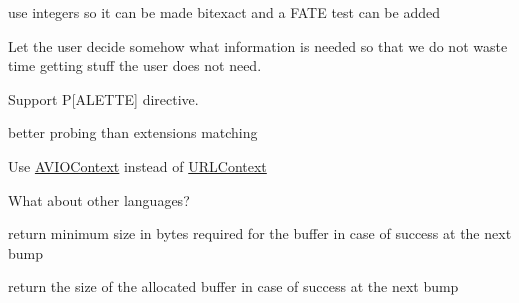 \begin{DoxyRefList}
\begin{DoxyItemize}
\item use integers so it can be made bitexact and a F\+A\+TE test can be added  
\end{DoxyItemize}
\item[Member \mbox{\hyperlink{group__lavf__decoding_gad42172e27cddafb81096939783b157bb}{avformat\+\_\+find\+\_\+stream\+\_\+info}} (\mbox{\hyperlink{struct_a_v_format_context}{A\+V\+Format\+Context}} $\ast$ic, \mbox{\hyperlink{struct_a_v_dictionary}{A\+V\+Dictionary}} $\ast$$\ast$options)]\label{todo__todo000034}%
%
Let the user decide somehow what information is needed so that we do not waste time getting stuff the user does not need.  
\item[File \mbox{\hyperlink{libavformat_2jacosubdec_8c}{jacosubdec.c}} ]\label{todo__todo000035}%
%
Support P\mbox{[}A\+L\+E\+T\+TE\mbox{]} directive.  
\item[File \mbox{\hyperlink{libmodplug_8c}{libmodplug.c}} ]\label{todo__todo000036}%
%
better probing than extensions matching  
\item[Member \mbox{\hyperlink{rtsp_8h_a8ac745c067a6a8a1cd15bc477e3673e3}{R\+T\+S\+P\+State}} ]\label{todo__todo000037}%
%
Use \mbox{\hyperlink{struct_a_v_i_o_context}{A\+V\+I\+O\+Context}} instead of \mbox{\hyperlink{struct_u_r_l_context}{U\+R\+L\+Context}}  
\item[Member \mbox{\hyperlink{struct_a_v_option_a6c72d22b8c599e89abba088b85dfcd8a}{A\+V\+Option\+::help}} ]\label{todo__todo000038}%
%
What about other languages?  
\item[Member \mbox{\hyperlink{group__lavu__sampmanip_ga673254a62fa75dab3211caf17c73c6eb}{av\+\_\+samples\+\_\+fill\+\_\+arrays}} (uint8\+\_\+t $\ast$$\ast$audio\+\_\+data, int $\ast$linesize, const uint8\+\_\+t $\ast$buf, int nb\+\_\+channels, int nb\+\_\+samples, enum A\+V\+Sample\+Format sample\+\_\+fmt, int align)]\label{todo__todo000039}%
%
return minimum size in bytes required for the buffer in case of success at the next bump  
\item[Member \mbox{\hyperlink{group__lavu__sampmanip_ga4db4c77f928d32c7d8854732f50b8c04}{av\+\_\+samples\+\_\+alloc}} (uint8\+\_\+t $\ast$$\ast$audio\+\_\+data, int $\ast$linesize, int nb\+\_\+channels, int nb\+\_\+samples, enum A\+V\+Sample\+Format sample\+\_\+fmt, int align)]\label{todo__todo000040}%
%
return the size of the allocated buffer in case of success at the next bump 
\end{DoxyRefList}